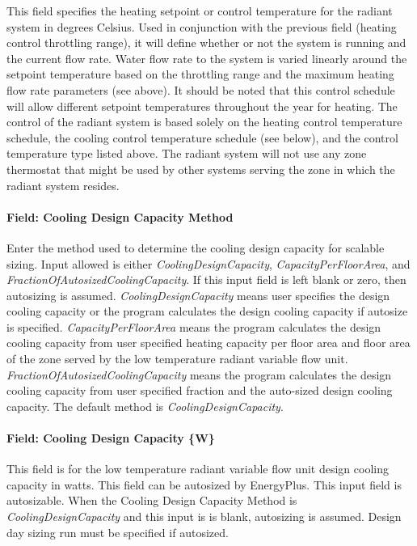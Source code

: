 This field specifies the heating setpoint or control temperature for the radiant system in degrees Celsius. Used in conjunction with the previous field (heating control throttling range), it will define whether or not the system is running and the current flow rate. Water flow rate to the system is varied linearly around the setpoint temperature based on the throttling range and the maximum heating flow rate parameters (see above). It should be noted that this control schedule will allow different setpoint temperatures throughout the year for heating. The control of the radiant system is based solely on the heating control temperature schedule, the cooling control temperature schedule (see below), and the control temperature type listed above. The radiant system will not use any zone thermostat that might be used by other systems serving the zone in which the radiant system resides.

\paragraph{Field: Cooling Design Capacity Method}\label{field-cooling-design-capacity-method-000}

Enter the method used to determine the cooling design capacity for scalable sizing. Input allowed is either \emph{CoolingDesignCapacity}, \emph{CapacityPerFloorArea}, and \emph{FractionOfAutosizedCoolingCapacity}. If this input field is left blank or zero, then autosizing is assumed. \emph{CoolingDesignCapacity} means user specifies the design cooling capacity or the program calculates the design cooling capacity if autosize is specified. \emph{CapacityPerFloorArea} means the program calculates the design cooling capacity from user specified heating capacity per floor area and floor area of the zone served by the low temperature radiant variable flow unit. \emph{FractionOfAutosizedCoolingCapacity} means the program calculates the design cooling capacity from user specified fraction and the auto-sized design cooling capacity. The default method is \emph{CoolingDesignCapacity}.

\paragraph{Field: Cooling Design Capacity \{W\}}\label{field-cooling-design-capacity-w-000}

This field is for the low temperature radiant variable flow unit design cooling capacity in watts. This field can be autosized by EnergyPlus. This input field is autosizable. When the Cooling Design Capacity Method is \emph{CoolingDesignCapacity} and this input is is blank, autosizing is assumed. Design day sizing run must be specified if autosized.

